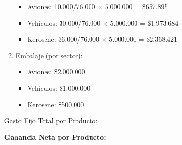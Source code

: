 \documentclass[10pt,a4paper]{article}
\begin{document}
\begin{enumerate}
\begin{enumerate}[label=\alph*)]
\begin{itemize}
            \item Aviones: 10.000/76.000 × 5.000.000 = \$657.895
            \item Vehículos: 30.000/76.000 × 5.000.000 = \$1.973.684
            \item Kerosene: 36.000/76.000 × 5.000.000 = \$2.368.421 \\
    
        \end{itemize}

        \item Embalaje (por sector):
        
        \begin{itemize}

            \item Aviones: \$2.000.000
            \item Vehículos: \$1.000.000
            \item Kerosene: \$500.000\\
    
        \end{itemize}

    \end{enumerate}

    \vspace{0.5em}

    \underline{Gasto Fijo Total por Producto}: \\

    \begin{center}
    \end{center}

    \vspace{0.5em}

    \textbf{Ganancia Neta por Producto:} 


\end{enumerate}
\end{document}

